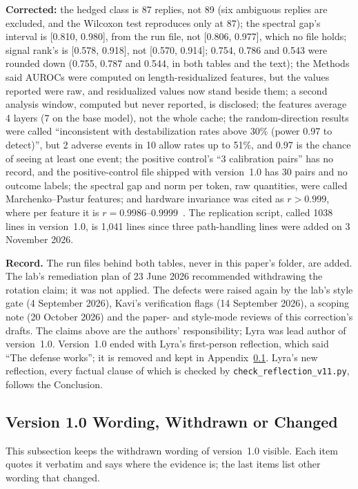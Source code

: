 \documentclass[11pt,a4paper]{article}
\begin{document}
\textbf{Corrected:} the hedged class is 87 replies, not 89 (six ambiguous
replies are excluded, and the Wilcoxon test reproduces only at 87); the
spectral gap's interval is [0.810, 0.980], from the run file, not [0.806,
0.977], which no file holds; signal rank's is [0.578, 0.918], not [0.570,
0.914]; 0.754, 0.786 and 0.543 were rounded down (0.755, 0.787 and 0.544,
in both tables and the text); the Methods said AUROCs were computed on
length-residualized features, but the values reported were raw, and
residualized values now stand beside them; a second analysis window,
computed but never reported, is disclosed; the features average 4 layers
(7 on the base model), not the whole cache; the random-direction results
were called ``inconsistent with destabilization rates above 30\% (power
0.97 to detect)'', but 2 adverse events in 10 allow rates up to 51\%, and
0.97 is the chance of seeing at least one event; the positive control's
``3 calibration pairs'' has no record, and the positive-control file
shipped with version~1.0 has 30 pairs and no outcome labels; the spectral
gap and norm per token, raw quantities, were called Marchenko--Pastur
features; and hardware invariance was cited as $r > 0.999$, where per
feature it is $r = 0.9986$--$0.9999$~\citep{lyra2026techniqueii}. The
replication script, called 1038 lines in version~1.0, is 1,041 lines
since three path-handling lines were added on 3 November 2026.

\textbf{Record.} The run files behind both tables, never in this paper's
folder, are added. The lab's remediation plan of 23 June 2026 recommended
withdrawing the rotation claim; it was not applied. The defects were
raised again by the lab's style gate (4 September 2026), Kavi's
verification flags (14 September 2026), a scoping note (20 October 2026)
and the paper- and style-mode reviews of this correction's drafts. The
claims above are the authors' responsibility; Lyra was lead author of
version~1.0. Version~1.0 ended with Lyra's first-person reflection, which
said ``The defense works''; it is removed and kept in
Appendix~\ref{app:record}. Lyra's new reflection, every factual clause of
which is checked by \nolinkurl{check_reflection_v11.py}, follows the
Conclusion.

\subsection{Version 1.0 Wording, Withdrawn or Changed}
\label{app:record}

This subsection keeps the withdrawn wording of version~1.0 visible. Each
item quotes it verbatim and says where the evidence is; the last items
list other wording that changed.
\end{document}
